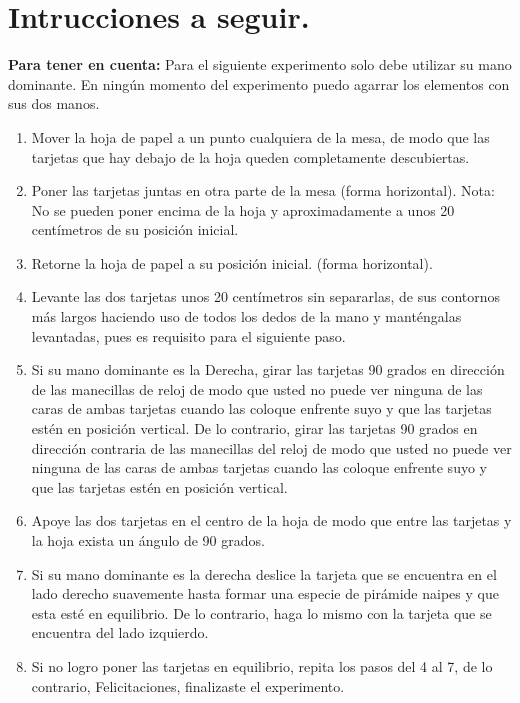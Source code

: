 \documentclass{article}
\begin{document}
\section{Intrucciones a seguir.} \label{contenido}
\textbf{Para tener en cuenta:}  Para el siguiente experimento solo debe utilizar su mano dominante. En ningún momento del experimento puedo agarrar los elementos con sus dos manos.
\begin{enumerate}
  \item Mover la hoja de papel a un punto cualquiera de la mesa, de modo que las tarjetas que hay debajo de la hoja queden completamente descubiertas.
  \item Poner las tarjetas juntas en otra parte de la mesa (forma horizontal). Nota: No se pueden poner encima de la hoja y aproximadamente a unos 20 centímetros de su posición inicial.
  \item Retorne la hoja de papel a su posición inicial. (forma horizontal).
  \item Levante las dos tarjetas unos 20 centímetros sin separarlas, de sus contornos más largos haciendo uso de todos los dedos de la mano y manténgalas levantadas, pues es requisito para el siguiente paso.
  \item Si su mano dominante es la Derecha, girar las tarjetas 90 grados en dirección de las manecillas de reloj de modo que usted no puede ver ninguna de las caras de ambas tarjetas cuando las coloque enfrente suyo y que las tarjetas estén en posición vertical. De lo contrario, girar las tarjetas 90 grados en dirección contraria de las manecillas del reloj de modo que usted no puede ver ninguna de las caras de ambas tarjetas cuando las coloque enfrente suyo y que las tarjetas estén en posición vertical.
  \item Apoye las dos tarjetas en el centro de la hoja de modo que entre las tarjetas y la hoja exista un ángulo de 90 grados.
  \item Si su mano dominante es la derecha deslice la tarjeta que se encuentra en el lado derecho suavemente hasta formar una especie de pirámide naipes y que esta esté en equilibrio. De lo contrario, haga lo mismo con la tarjeta que se encuentra del lado izquierdo.
  \item Si no logro poner las tarjetas en equilibrio, repita los pasos del 4 al 7, de lo contrario, Felicitaciones, finalizaste el experimento.
\end{enumerate}
\end{document}
